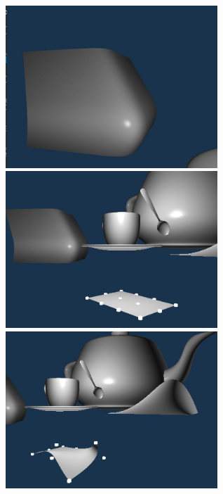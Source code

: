 \documentclass[acmtog]{acmart}
\begin{document}
\begin{figure}[h]
	\centering
	{\includegraphics[width=8cm]{bspline.JPG}}
	{\includegraphics[width=8cm]{interactive1.JPG}}
	{\includegraphics[width=8cm]{interactive2.JPG}}
\end{figure}
\end{document}
